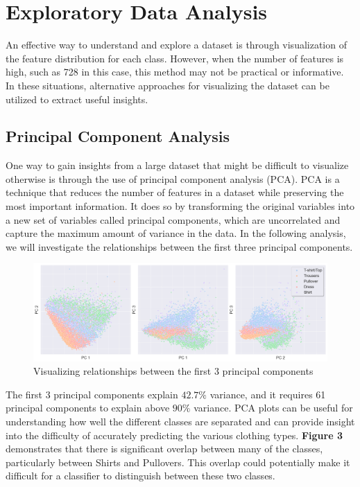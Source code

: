 \section{Exploratory Data Analysis}

An effective way to understand and explore a dataset is through visualization of the feature distribution for each class.
However, when the number of features is high, such as 728 in this case, this method may not be practical or informative.
In these situations, alternative approaches for visualizing the dataset can be utilized to extract useful insights.

\subsection{Principal Component Analysis}
One way to gain insights from a large dataset that might be difficult to visualize otherwise is through the use of principal component analysis (PCA).
PCA is a technique that reduces the number of features in a dataset while preserving the most important information.
It does so by transforming the original variables into a new set of variables called principal components, which are uncorrelated and capture the maximum amount of variance in the data.
In the following analysis, we will investigate the relationships between the first three principal components.

\begin{figure}[H]
    \includegraphics[scale=0.30]{figures_for_report/PCA}
    \captionsetup{justification=centering,margin=2cm}
    \caption{Visualizing relationships between the first 3 principal components}
\end{figure}

The first 3 principal components explain $42.7\%$ variance, and it requires 61 principal components to explain above $90\%$ variance.
PCA plots can be useful for understanding how well the different classes are separated and can provide insight into the difficulty of accurately predicting the various clothing types.
\textbf{Figure 3} demonstrates that there is significant overlap between many of the classes, particularly between Shirts and Pullovers.
This overlap could potentially make it difficult for a classifier to distinguish between these two classes.